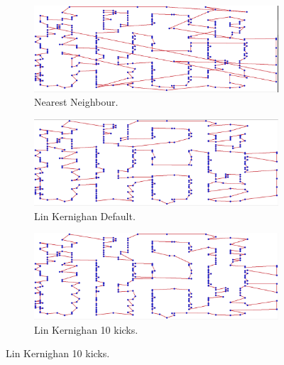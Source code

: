 \documentclass[13pt,a4paper]{article}
\begin{document}
\begin{figure}[b]
    \begin{subfigure}[t]{0.3\textwidth}
        \centering
        \includegraphics[width=\textwidth]{img/1/N.png}
        \caption{Nearest Neighbour.}
    \end{subfigure}
    \begin{subfigure}[t]{0.3\textwidth}
        \centering
        \includegraphics[width=\textwidth]{img/1/L1.png}
        \caption{Lin Kernighan Default.}
    \end{subfigure}
    \begin{subfigure}[t]{0.3\textwidth}
        \centering
        \includegraphics[width=\textwidth]{img/1/L10.png}
        \caption{Lin Kernighan 10 kicks.}
    \end{subfigure}


\end{figure}
\end{document}
